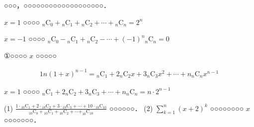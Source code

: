 \noindent
○○○，○○○○○○○○○○○○○○○○○○○．\par
\noindent
$x=1$ ○○○○ ${}_{n}\!\mathrm{C}_{0}+{}_{n}\!\mathrm{C}_{1}+{}_{n}\!\mathrm{C}_{2}+\cdots+{}_{n}\!\mathrm{C}_{n}=2^{n}$\par
\noindent
$x=-1$ ○○○○ ${}_{n}\!\mathrm{C}_{0}-{}_{n}\!\mathrm{C}_{1}+{}_{n}\!\mathrm{C}_{2}-\cdots+(-1)^{n}{}_{n}\!\mathrm{C}_{n}=0$

\noindent
①○○○○ $x$ ○○○○○
\begin{fleqn}[4zw]
\begin{alignat*}{1}
n(1+x)^{n-1}={}_{n}\!\mathrm{C}_{1}+2 {}_{n}\!\mathrm{C}_2x+3{}_{n}\!\mathrm{C}_{3}x^{2}+\cdots+n{}_{n}\!\mathrm{C}_{n}x^{n-1}
\end{alignat*}
\end{fleqn}\par
\noindent
$x=1$ ○○○○ ${}_{n}\!\mathrm{C}_{1}+2{}_{n}\!\mathrm{C}_{2}+3{}_{n}\!\mathrm{C}_{3}+ \cdots +n_{n}\!\mathrm{C}_{n}=n\cdot 2^{n-1}$

\begin{例題}
(1) \quad $\frac{1\cdot {}_{10}\mathrm{C}_{1}+2\cdot {}_{10}\mathrm{C}_{2}+3\cdot {}_{10}\mathrm{C}_{3}+\cdots+10\cdot {}_{10}\mathrm{C}_{10}}{{}_{10}\mathrm{C}_{0}+{}_{10}\mathrm{C}_{1}+{}_{10}\mathrm{C}_{2}+\cdots+_{10}\!\mathrm{C}_{10}}$ ○○○○○○．
(2) \quad $\sum_{k=1}^{n}(x+2)^{k}$ ○○○○○○○○ $x$ ○○○○○○○．
\end{例題}

